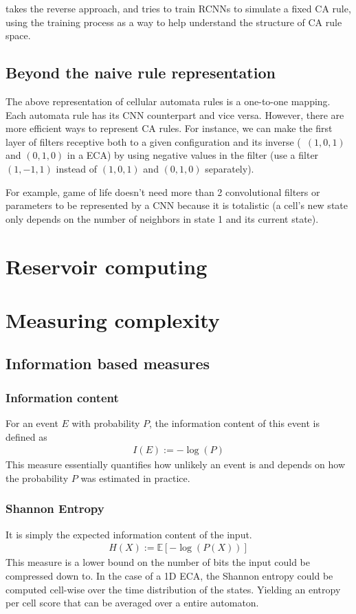 \cite{gilpinCellularAutomataConvolutional2018} takes the reverse approach, and
tries to train RCNNs to simulate a fixed CA rule, using the training process as
a way to help understand the structure of CA rule space.

\subsection{Beyond the naive rule representation}

The above representation of cellular automata rules is a one-to-one mapping.
Each automata rule has its CNN counterpart and vice versa. However, there are
more efficient ways to represent CA rules. For instance, we can make the first
layer of filters receptive both to a given configuration and its inverse
(\eg~$(1, 0, 1)$ and $(0, 1, 0)$ in a ECA) by using negative values in the
filter (use a filter $(1, -1, 1)$ instead of $(1, 0, 1)$ and $(0, 1, 0)$
separately).

For example, game of life doesn't need more than 2 convolutional filters or
parameters to be represented by a CNN because it is totalistic (a cell's new
state only depends on the number of neighbors in state 1 and its current state).


\section{Reservoir computing}

\section{Measuring complexity}

\subsection{Information based measures}

\subsubsection{Information content}
For an event $E$ with probability $P$, the information content of this event is
defined as
\begin{align*}
  I(E) := -\log(P)
\end{align*}
This measure essentially quantifies how unlikely an event is and depends on how
the probability $P$ was estimated in practice.

\subsubsection{Shannon Entropy}
It is simply the expected information content of the input.
\begin{align*}
  H(X) := \mathbb{E}[-\log(P(X))]
\end{align*}
This measure is a lower bound on the number of bits the input could be
compressed down to. In the case of a 1D ECA, the Shannon entropy could be
computed cell-wise over the time distribution of the states. Yielding an entropy
per cell score that can be averaged over a entire automaton.

